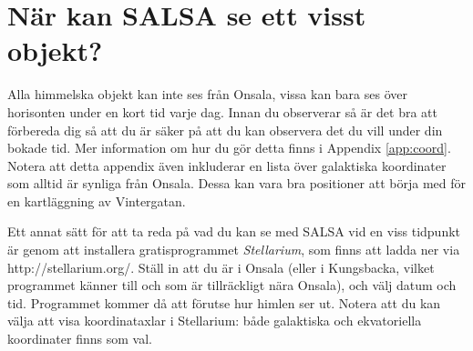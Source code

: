 %

\section{När kan SALSA se ett visst objekt?}
Alla himmelska objekt kan inte ses från Onsala, vissa kan bara ses över horisonten
under en kort tid varje dag. Innan du observerar så är det bra att förbereda dig
så att du är säker på att du kan observera det du vill under din bokade tid.
Mer information om hur du gör detta finns i Appendix \ref{app:coord}. Notera att
detta appendix även inkluderar en lista över galaktiska koordinater som alltid
är synliga från Onsala. Dessa kan vara bra positioner att börja med för en 
kartläggning av Vintergatan.

Ett annat sätt för att ta reda på vad du kan se med SALSA vid en viss tidpunkt
är genom att installera gratisprogrammet \emph{Stellarium}, som finns att 
ladda ner via http://stellarium.org/. Ställ in att du är i Onsala (eller i 
Kungsbacka, vilket programmet känner till och som är tillräckligt nära Onsala),
och välj datum och tid. Programmet kommer då att förutse hur himlen ser ut. 
Notera att du kan välja att visa koordinataxlar i Stellarium: både galaktiska
och ekvatoriella koordinater finns som val.

